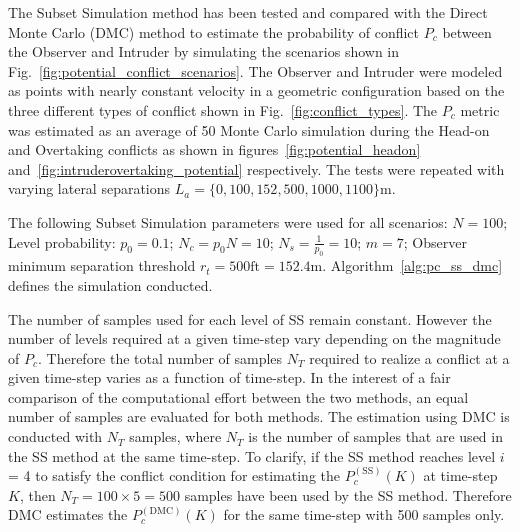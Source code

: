 \documentclass[journal]{IEEEtran}
\begin{document}
The Subset Simulation method has been tested and compared with the Direct Monte Carlo (DMC) method to estimate the probability of conflict $P_{c}$ between the Observer and Intruder by simulating the scenarios shown in Fig.~\ref{fig:potential_conflict_scenarios}. The Observer and Intruder were modeled as points with nearly constant velocity in a geometric configuration based on the three different types of conflict shown in Fig.~\ref{fig:conflict_types}. The $P_{c}$ metric was estimated as an average of 50 Monte Carlo simulation during the Head-on and Overtaking conflicts as shown in figures~\ref{fig:potential_headon} and~\ref{fig:intruderovertaking_potential} respectively. The tests were repeated with varying lateral separations $L_{a} = \{0, 100, 152, 500, 1000, 1100\} \text{m}$. 

The following Subset Simulation parameters were used for all scenarios: $N = 100$; Level probability: $p_{0} = 0.1$;  $N_c = p_{0}N = 10$; $N_s = \frac{1}{p_{0}} = 10$; $m = 7$; Observer minimum separation threshold $r_{t} = 500 \text{ft} = 152.4 \text{m}$. Algorithm~\ref{alg:pc_ss_dmc} defines the simulation conducted.

The number of samples used for each level of SS remain constant. However the number of levels required at a given time-step vary depending on the magnitude of $P_{c}$. Therefore the total number of samples $N_{T}$ required to realize a conflict at a given time-step varies as a function of time-step. In the interest of a fair comparison of the computational effort between the two methods, an equal number of samples are evaluated for both methods. The estimation using DMC is conducted with $N_{T}$ samples, where $N_{T}$ is the number of samples that are used in the SS method at the same time-step. To clarify, if the SS method reaches level $i$ = 4 to satisfy the conflict condition for estimating the $P_{c}^{(\text{SS})}(K)$ at time-step $K$, then $N_{T} = 100 \times 5 = 500$ samples have been used by the SS method. Therefore DMC estimates the $P_{c}^{(\text{DMC})}(K)$ for the same time-step with 500 samples only.
\end{document}
